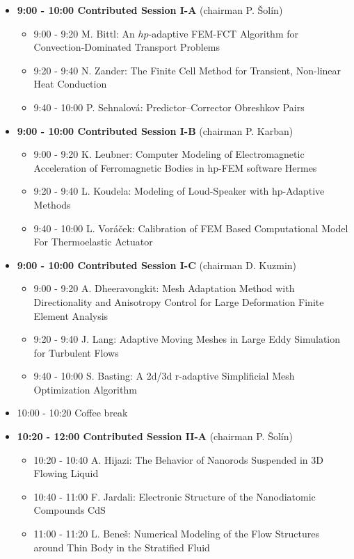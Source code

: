 \documentclass[10pt, A4]{article}%
\begin{document}
\begin{itemize}    
  \item {\bf 9:00 - 10:00 Contributed Session I-A} (chairman P. \v{S}ol\'{i}n) 
  \begin{itemize}
    \item 9:00 - 9:20 M. Bittl: An $hp$-adaptive FEM-FCT Algorithm for Convection-Dominated Transport Problems
    \item 9:20 - 9:40 N. Zander: The Finite Cell Method for Transient, Non-linear Heat Conduction
    \item 9:40 - 10:00 P. Sehnalov\'{a}: Predictor–Corrector Obreshkov Pairs
  \end{itemize}
  \item {\bf 9:00 - 10:00 Contributed Session I-B} (chairman P. Karban) 
  \begin{itemize}
    \item 9:00 - 9:20 K. Leubner: Computer Modeling of Electromagnetic Acceleration of Ferromagnetic Bodies in hp-FEM software Hermes
    \item 9:20 - 9:40 L. Koudela: Modeling of Loud-Speaker with hp-Adaptive Methods
    \item 9:40 - 10:00 L. Vor\'{a}\v{c}ek: Calibration of FEM Based Computational Model For Thermoelastic Actuator
  \end{itemize}
  \item {\bf 9:00 - 10:00 Contributed Session I-C} (chairman D. Kuzmin) 
  \begin{itemize}
    \item 9:00 - 9:20 A. Dheeravongkit: Mesh Adaptation Method with Directionality and Anisotropy Control for Large Deformation Finite Element Analysis
    \item 9:20 - 9:40 J. Lang: Adaptive Moving Meshes in Large Eddy Simulation for Turbulent Flows
    \item 9:40 - 10:00 S. Basting: A 2d/3d r-adaptive Simplificial Mesh Optimization Algorithm
  \end{itemize}
  \item 10:00 - 10:20 Coffee break
  \item {\bf 10:20 - 12:00 Contributed Session II-A} (chairman P. \v{S}ol\'{i}n) 
  \begin{itemize}
    \item 10:20 - 10:40 A. Hijazi: The Behavior of Nanorods Suspended in 3D Flowing Liquid
    \item 10:40 - 11:00 F. Jardali: Electronic Structure of the Nanodiatomic Compounds CdS
    \item 11:00 - 11:20 L. Bene\v{s}: Numerical Modeling of the Flow Structures around Thin Body in the Stratified Fluid 

\end{itemize}
\end{itemize}
\end{document}
